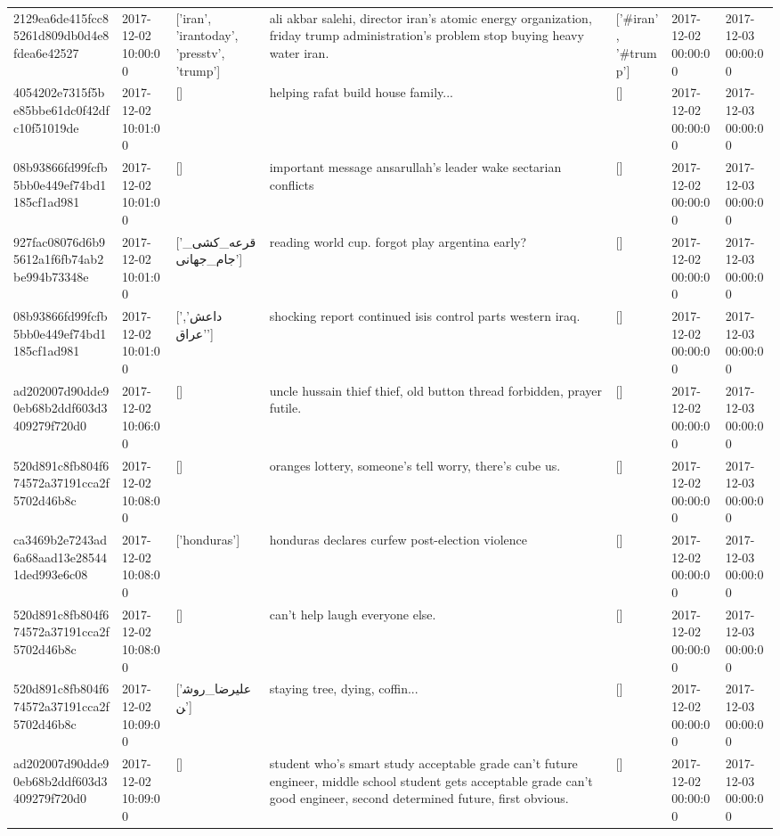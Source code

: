\begin{tabular}{lllllll}
2129ea6de415fcc85261d809db0d4e8fdea6e42527 & 2017-12-02 10:00:00 & ['iran', 'irantoday', 'presstv', 'trump'] & ali akbar salehi, director iran's atomic energy organization, friday trump administration's problem stop buying heavy water iran. & ['#iran', '#trump'] & 2017-12-02 00:00:00 & 2017-12-03 00:00:00 \\
4054202e7315f5be85bbe61dc0f42dfc10f51019de & 2017-12-02 10:01:00 & [] & helping rafat build house family... & [] & 2017-12-02 00:00:00 & 2017-12-03 00:00:00 \\
08b93866fd99fcfb5bb0e449ef74bd1185cf1ad981 & 2017-12-02 10:01:00 & [] & important message ansarullah's leader wake sectarian conflicts & [] & 2017-12-02 00:00:00 & 2017-12-03 00:00:00 \\
927fac08076d6b95612a1f6fb74ab2be994b73348e & 2017-12-02 10:01:00 & ['قرعه_کشی_جام_جهانی'] & reading world cup. forgot play argentina early? & [] & 2017-12-02 00:00:00 & 2017-12-03 00:00:00 \\
08b93866fd99fcfb5bb0e449ef74bd1185cf1ad981 & 2017-12-02 10:01:00 & ['داعش', 'عراق'] & shocking report continued isis control parts western iraq. & [] & 2017-12-02 00:00:00 & 2017-12-03 00:00:00 \\
ad202007d90dde90eb68b2ddf603d3409279f720d0 & 2017-12-02 10:06:00 & [] & uncle hussain thief thief, old button thread forbidden, prayer futile. & [] & 2017-12-02 00:00:00 & 2017-12-03 00:00:00 \\
520d891c8fb804f674572a37191cca2f5702d46b8c & 2017-12-02 10:08:00 & [] & oranges lottery, someone's tell worry, there's cube us. & [] & 2017-12-02 00:00:00 & 2017-12-03 00:00:00 \\
ca3469b2e7243ad6a68aad13e285441ded993e6c08 & 2017-12-02 10:08:00 & ['honduras'] & honduras declares curfew post-election violence & [] & 2017-12-02 00:00:00 & 2017-12-03 00:00:00 \\
520d891c8fb804f674572a37191cca2f5702d46b8c & 2017-12-02 10:08:00 & [] & can't help laugh everyone else. & [] & 2017-12-02 00:00:00 & 2017-12-03 00:00:00 \\
520d891c8fb804f674572a37191cca2f5702d46b8c & 2017-12-02 10:09:00 & ['علیرضا_روشن'] & staying tree, dying, coffin... & [] & 2017-12-02 00:00:00 & 2017-12-03 00:00:00 \\
ad202007d90dde90eb68b2ddf603d3409279f720d0 & 2017-12-02 10:09:00 & [] & student who's smart study acceptable grade can't future engineer, middle school student gets acceptable grade can't good engineer, second determined future, first obvious. & [] & 2017-12-02 00:00:00 & 2017-12-03 00:00:00 \\

\end{tabular}
